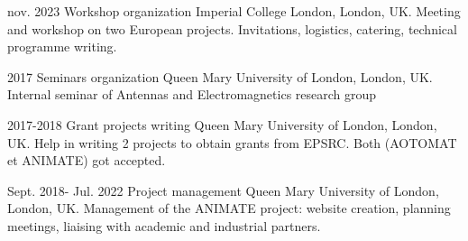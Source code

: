 \documentclass{cv}
\begin{document}
\begin{entrylist}

	\entry
	{nov. 2023}
	{Workshop organization}
	{Imperial College London, London, UK.}
	{Meeting and workshop on two European projects. Invitations, logistics, catering, technical programme writing.}

	\entry
	{2017}
	{Seminars organization}
	{Queen Mary University of London, London, UK.}
	{Internal seminar of Antennas and Electromagnetics research group}

	\entry
	{2017-2018}
	{Grant projects writing}
	{Queen Mary University of London, London, UK.}
	{
		Help in writing 2 projects to obtain grants from EPSRC. Both (AOTOMAT et ANIMATE) got accepted.}

	\entry
	{Sept. 2018- Jul. 2022}
	{Project management}
	{Queen Mary University of London, London, UK.}
	{
		Management of the ANIMATE project: website creation, planning meetings,
		liaising with academic and industrial partners.}


\end{entrylist}





\end{document}
